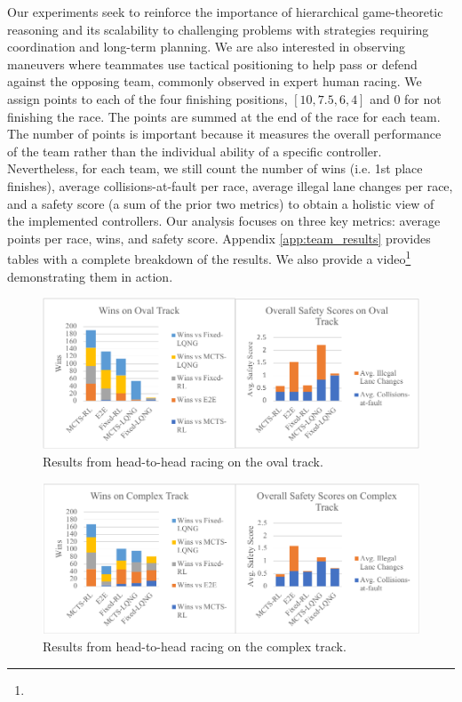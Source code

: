 Our experiments seek to reinforce the importance of hierarchical game-theoretic reasoning and its scalability to challenging problems with strategies requiring coordination and long-term planning. We are also interested in observing maneuvers where teammates use tactical positioning to help pass or defend against the opposing team, commonly observed in expert human racing. We assign points to each of the four finishing positions, $[10, 7.5, 6, 4]$ and $0$ for not finishing the race. The points are summed at the end of the race for each team. The number of points is important because it measures the overall performance of the team rather than the individual ability of a specific controller. Nevertheless, for each team, we still count the number of wins (i.e. 1st place finishes), average collisions-at-fault per race, average illegal lane changes per race, and a safety score (a sum of the prior two metrics) to obtain a holistic view of the implemented controllers. Our analysis focuses on three key metrics: average points per race, wins, and safety score. Appendix \ref{app:team_results} provides tables with a complete breakdown of the results. We also provide a video\footnote{\vidurlteam} demonstrating them in action. 

\begin{figure}
  \centering
  \includegraphics[width=\textwidth]{Figures/OvalResultsNew2.pdf}
  \caption{Results from head-to-head racing on the oval track.}
  \label{fig:team_results_oval}
\end{figure}
\begin{figure}
\centering
  \includegraphics[width=\textwidth]{Figures/ComplexResultsNew2.pdf}
  \caption{Results from head-to-head racing on the complex track.}
  \label{fig:team_results_complex}
\end{figure}

